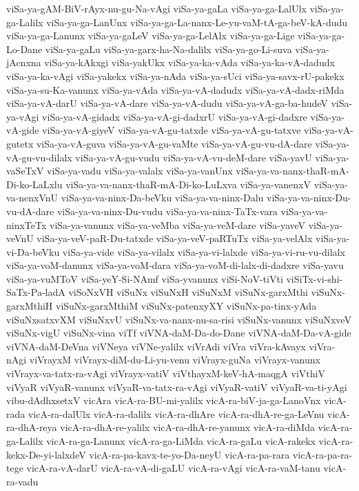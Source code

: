 {viSa-ya-gAM-BiV-rAyx-nu-gu-Na-vAgi
viSa-ya-gaLa
viSa-ya-ga-LalUlx
viSa-ya-ga-Lalilx
viSa-ya-ga-LanUnx
viSa-ya-ga-La-nanx-Le-yu-vaM-tA-ga-beV-kA-dudu
viSa-ya-ga-Lanunx
viSa-ya-gaLeV
viSa-ya-ga-LelAlx
viSa-ya-ga-Lige
viSa-ya-ga-Lo-Dane
viSa-ya-gaLu
viSa-ya-garx-ha-Na-dalilx
viSa-ya-go-Li-suva
viSa-ya-jAcnxna
viSa-ya-kAkxgi
viSa-yakUkx
viSa-ya-ka-vAda
viSa-ya-ka-vA-dadudx
viSa-ya-ka-vAgi
viSa-yakekx
viSa-ya-nAda
viSa-ya-sUci
viSa-ya-savx-rU-pakekx
viSa-ya-su-Ka-vanunx
viSa-ya-vAda
viSa-ya-vA-dadudx
viSa-ya-vA-dadx-riMda
viSa-ya-vA-darU
viSa-ya-vA-dare
viSa-ya-vA-dudu
viSa-ya-vA-ga-ba-hudeV
viSa-ya-vAgi
viSa-ya-vA-gidadx
viSa-ya-vA-gi-dadxrU
viSa-ya-vA-gi-dadxre
viSa-ya-vA-gide
viSa-ya-vA-giyeV
viSa-ya-vA-gu-tatxde
viSa-ya-vA-gu-tatxve
viSa-ya-vA-gutetx
viSa-ya-vA-guva
viSa-ya-vA-gu-vaMte
viSa-ya-vA-gu-vu-dA-dare
viSa-ya-vA-gu-vu-dilalx
viSa-ya-vA-gu-vudu
viSa-ya-vA-vu-deM-dare
viSa-yavU
viSa-ya-vaSeTxV
viSa-ya-vadu
viSa-ya-valalx
viSa-ya-vanUnx
viSa-ya-va-nanx-thaR-mA-Di-ko-LaLxlu
viSa-ya-va-nanx-thaR-mA-Di-ko-LuLxva
viSa-ya-vanenxV
viSa-ya-va-nenxVnU
viSa-ya-va-ninx-Da-beVku
viSa-ya-va-ninx-Dalu
viSa-ya-va-ninx-Du-vu-dA-dare
viSa-ya-va-ninx-Du-vudu
viSa-ya-va-ninx-TaTx-vara
viSa-ya-va-ninxTeTx
viSa-ya-vanunx
viSa-ya-veMba
viSa-ya-veM-dare
viSa-yaveV
viSa-ya-veVnU
viSa-ya-veV-paR-Du-tatxde
viSa-ya-veV-paRTuTx
viSa-ya-velAlx
viSa-ya-vi-Da-beVku
viSa-ya-vide
viSa-ya-vilalx
viSa-ya-vi-lalxde
viSa-ya-vi-ru-vu-dilalx
viSa-ya-voM-danunx
viSa-ya-voM-dara
viSa-ya-voM-di-lalx-di-dadxre
viSa-yavu
viSa-ya-vuMToV
viSa-yeY-Si-NAmf
viSa-yvanunx
viSi-NoV-tiVti
viSiTx-vi-shi-SaTx-Pa-ladA
viSoNxVH
viSuNx
viSuNxH
viSuNxM
viSuNx-garxMthi
viSuNx-garxMthiH
viSuNx-garxMthiM
viSuNx-patenxyXY
viSuNx-pa-tinx-yAda
viSuNxsatxvXM
viSuNxvU
viSuNx-va-nanx-nu-sa-risi
viSuNx-vanunx
viSuNxveV
viSuNx-vigU
viSuNx-vina
viTf
viVNA-daM-Da-do-Dane
viVNA-daM-Da-vA-gide
viVNA-daM-DeVna
viVNeya
viVNe-yalilx
viVrAdi
viVra
viVra-kAvayx
viVra-nAgi
viVrayxM
viVrayx-diM-du-Li-yu-venu
viVrayx-guNa
viVrayx-vanunx
viVrayx-va-tatx-ra-vAgi
viVrayx-vatiV
viVthayxM-keV-hA-maqgA
viVthiV
viVyaR
viVyaR-vanunx
viVyaR-va-tatx-ra-vAgi
viVyaR-vatiV
viVyaR-va-ti-yAgi
vibu-dAdhxsetxV
vicAra
vicA-ra-BU-mi-yalilx
vicA-ra-biV-ja-ga-LanoVnx
vicA-rada
vicA-ra-dalUlx
vicA-ra-dalilx
vicA-ra-dhAre
vicA-ra-dhA-re-ga-LeVnu
vicA-ra-dhA-reya
vicA-ra-dhA-re-yalilx
vicA-ra-dhA-re-yanunx
vicA-ra-diMda
vicA-ra-ga-Lalilx
vicA-ra-ga-Lanunx
vicA-ra-ga-LiMda
vicA-ra-gaLu
vicA-rakekx
vicA-ra-kekx-De-yi-lalxdeV
vicA-ra-pa-kavx-te-yo-Da-neyU
vicA-ra-pa-rara
vicA-ra-pa-ra-tege
vicA-ra-vA-darU
vicA-ra-vA-di-gaLU
vicA-ra-vAgi
vicA-ra-vaM-tanu
vicA-ra-vadu
}
